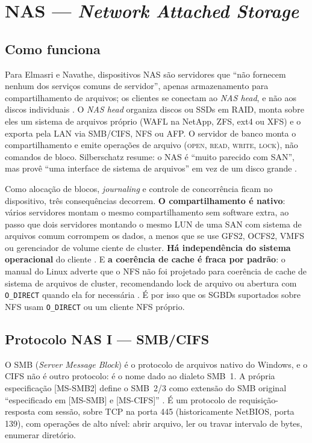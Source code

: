 \documentclass[11pt,a4paper]{article}
\begin{document}
\section{NAS --- \textit{Network Attached Storage}}
\label{sec:nas}

\subsection{Como funciona}
\label{sec:nascomo}

Para Elmasri e Navathe, dispositivos NAS são servidores que ``não fornecem nenhum dos serviços comuns
de servidor'', apenas armazenamento para compartilhamento de arquivos; os clientes se conectam ao
\textit{NAS head}, e não aos discos individuais \cite{elmasri2018}. O \textit{NAS head} organiza discos
ou SSDs em RAID, monta sobre eles um sistema de arquivos próprio (WAFL na NetApp, ZFS, ext4 ou XFS) e
o exporta pela LAN via SMB/CIFS, NFS ou AFP. O servidor de banco monta o compartilhamento e emite
operações de arquivo (\textsc{open}, \textsc{read}, \textsc{write}, \textsc{lock}), não comandos de
bloco. Silberschatz resume: o NAS é ``muito parecido com SAN'', mas provê ``uma interface de sistema de
arquivos'' em vez de um disco grande \cite{silberschatz2020}.

Como alocação de blocos, \textit{journaling} e controle de concorrência ficam no dispositivo, três
consequências decorrem. \textbf{O compartilhamento é nativo}: vários servidores montam o mesmo
compartilhamento sem software extra, ao passo que dois servidores montando o mesmo LUN de uma SAN com
sistema de arquivos comum corrompem os dados, a menos que se use GFS2, OCFS2, VMFS ou gerenciador de
volume ciente de cluster. \textbf{Há independência do sistema operacional} do cliente
\cite{elmasri2018}. E \textbf{a coerência de cache é fraca por padrão}: o manual do Linux adverte que o
NFS não foi projetado para coerência de cache de sistema de arquivos de cluster, recomendando lock de
arquivo ou abertura com \texttt{O\_DIRECT} quando ela for necessária \cite{nfsman}. É por isso que os
SGBDs suportados sobre NFS usam \texttt{O\_DIRECT} ou um cliente NFS próprio.

\subsection{Protocolo NAS I --- SMB/CIFS}
\label{sec:smb}

O SMB (\textit{Server Message Block}) é o protocolo de arquivos nativo do Windows, e o CIFS não é outro
protocolo: é o nome dado ao dialeto SMB~1. A própria especificação [MS-SMB2] define o SMB~2/3 como
extensão do SMB original ``especificado em [MS-SMB] e [MS-CIFS]'' \cite{mssmb2ovw}. É um protocolo de
requisição-resposta com sessão, sobre TCP na porta 445 (historicamente NetBIOS, porta 139), com
operações de alto nível: abrir arquivo, ler ou travar intervalo de bytes, enumerar diretório.
\end{document}
